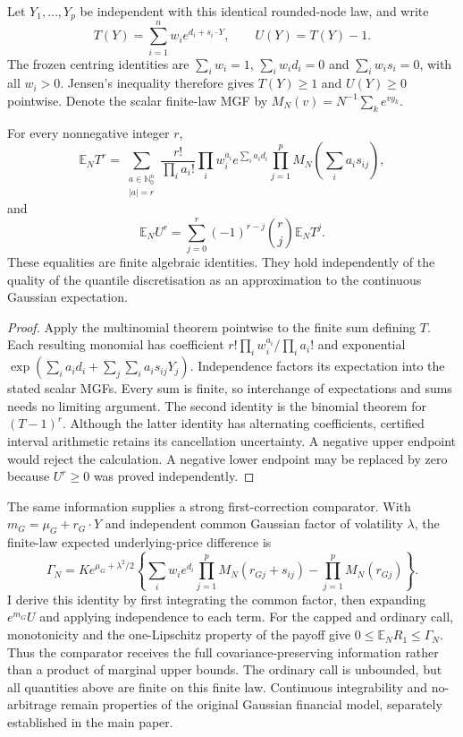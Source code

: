 Let $Y_1,\ldots,Y_p$ be independent with this identical rounded-node law,
and write
\[
 T(Y)=\sum_{i=1}^{n}w_i e^{d_i+s_i\cdot Y},\qquad U(Y)=T(Y)-1.
\]
The frozen centring identities are $\sum_iw_i=1$,
$\sum_iw_id_i=0$ and $\sum_iw_is_i=0$, with all $w_i>0$.
Jensen's inequality therefore gives $T(Y)\geq1$ and $U(Y)\geq0$ pointwise.
Denote the scalar finite-law MGF by $M_N(v)=N^{-1}\sum_ke^{vy_k}$.

\begin{proposition}
For every nonnegative integer $r$,
\[
 \mathbb E_N T^r
 =\sum_{\substack{a\in\mathbb N_0^n\\|a|=r}}
 \frac{r!}{\prod_i a_i!}\prod_iw_i^{a_i}
 e^{\sum_i a_i d_i}
 \prod_{j=1}^{p}M_N\!\left(\sum_i a_i s_{ij}\right),
\]
and
\[
 \mathbb E_N U^r
 =\sum_{j=0}^{r}(-1)^{r-j}\binom rj\mathbb E_N T^j.
\]
These equalities are finite algebraic identities. They hold independently
of the quality of the quantile discretisation as an approximation to the
continuous Gaussian expectation.
\end{proposition}

\begin{proof}
Apply the multinomial theorem pointwise to the finite sum defining $T$.
Each resulting monomial has coefficient
$r!\prod_iw_i^{a_i}/\prod_i a_i!$ and exponential
$\exp(\sum_i a_id_i+\sum_j\sum_i a_is_{ij}Y_j)$.
Independence factors its expectation into the stated scalar MGFs. Every sum
is finite, so interchange of expectations and sums needs no limiting
argument. The second identity is the binomial theorem for $(T-1)^r$.
Although the latter identity has alternating coefficients, certified interval
arithmetic retains its cancellation uncertainty. A negative upper endpoint
would reject the calculation. A negative lower endpoint may be replaced by
zero because $U^r\geq0$ was proved independently.
\end{proof}

The same information supplies a strong first-correction comparator. With
$m_G=\mu_G+r_G\cdot Y$ and independent common Gaussian factor of volatility
$\lambda$, the finite-law expected underlying-price difference is
\[
 \Gamma_N=K e^{\mu_G+\lambda^2/2}
 \left\{
 \sum_i w_i e^{d_i}\prod_{j=1}^{p}M_N(r_{Gj}+s_{ij})
 -\prod_{j=1}^{p}M_N(r_{Gj})\right\}.
\]
I derive this identity by first integrating the common factor, then
expanding $e^{m_G}U$ and applying independence to each term. For the capped
and ordinary call, monotonicity and the one-Lipschitz property of the payoff
give $0\leq\mathbb E_N R_1\leq\Gamma_N$. Thus the comparator receives
the full covariance-preserving information rather than a product of marginal
upper bounds. The ordinary call is unbounded, but all quantities above are
finite on this finite law. Continuous integrability and no-arbitrage remain
properties of the original Gaussian financial model, separately established
in the main paper.

